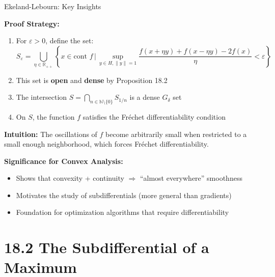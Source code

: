 \documentclass[aspectratio=169,10pt]{beamer}
\theoremstyle{definition}
\begin{document}
\begin{frame}{Ekeland-Lebourn: Key Insights}

\textbf{Proof Strategy:}

\begin{enumerate}
  \item For $\varepsilon > 0$, define the set:
  $$S_\varepsilon = \bigcup_{\eta \in \mathbb{R}_{++}} \left\{ x \in \text{cont } f \, \bigg| \,
    \sup_{y \in H, \|y\|=1} \frac{f(x+\eta y) + f(x-\eta y) - 2f(x)}{\eta} < \varepsilon \right\}$$

  \item This set is \textbf{open} and \textbf{dense} by Proposition 18.2

  \item The intersection $S = \bigcap_{n \in \mathbb{N} \setminus \{0\}} S_{1/n}$
        is a dense $G_\delta$ set

  \item On $S$, the function $f$ satisfies the Fréchet differentiability condition
\end{enumerate}

\vspace{0.3cm}

\textbf{Intuition:} The oscillations of $f$ become arbitrarily small when restricted
to a small enough neighborhood, which forces Fréchet differentiability.

\vspace{0.3cm}

\textbf{Significance for Convex Analysis:}
\begin{itemize}
  \item Shows that convexity + continuity $\Rightarrow$ ``almost everywhere'' smoothness
  \item Motivates the study of subdifferentials (more general than gradients)
  \item Foundation for optimization algorithms that require differentiability
\end{itemize}

\end{frame}


\section{18.2 The Subdifferential of a Maximum}
\end{document}
